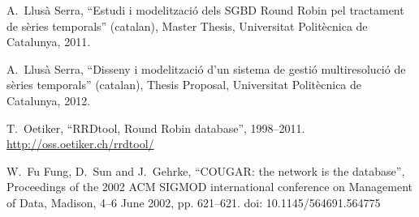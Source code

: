 \documentclass{scrartcl}
\begin{document}

\begin{thebibliography}{99}


 A.\ Llusà Serra, ``Estudi i modelització
  dels SGBD Round Robin pel tractament de sèries temporals''
  (catalan), Master Thesis, Universitat Politècnica de Catalunya,
  2011. 

 A.\ Llusà Serra, ``Disseny i modelització
  d'un sistema de gestió multiresolució de sèries temporals''
  (catalan), Thesis Proposal, Universitat Politècnica de Catalunya,
  2012. 


 T.\ Oetiker, ``RRDtool, Round Robin database'',
  1998--2011.  \url{http://oss.oetiker.ch/rrdtool/}


 W.\ Fu Fung, D.\ Sun and J.\ Gehrke, ``COUGAR: the network is the database'', Proceedings of the 2002 ACM SIGMOD international conference on Management of Data, Madison, 4--6 June 2002, pp. 621--621. doi: 10.1145/564691.564775 



\end{thebibliography}
\end{document}
